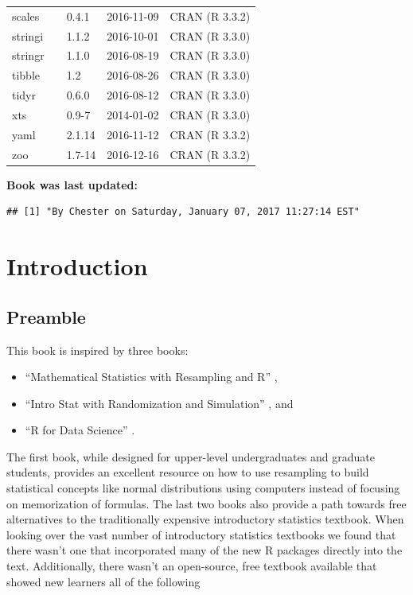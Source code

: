 \documentclass[]{tufte-book}
\providecommand{\tightlist}{%
  \setlength{\itemsep}{0pt}\setlength{\parskip}{0pt}}
\begin{document}
\begin{longtable}{lllll}
scales &  & 0.4.1 & 2016-11-09 & CRAN (R 3.3.2)\\
stringi &  & 1.1.2 & 2016-10-01 & CRAN (R 3.3.0)\\
stringr &  & 1.1.0 & 2016-08-19 & CRAN (R 3.3.0)\\
\addlinespace
tibble &  & 1.2 & 2016-08-26 & CRAN (R 3.3.0)\\
tidyr &  & 0.6.0 & 2016-08-12 & CRAN (R 3.3.0)\\
xts &  & 0.9-7 & 2014-01-02 & CRAN (R 3.3.0)\\
yaml &  & 2.1.14 & 2016-11-12 & CRAN (R 3.3.2)\\
zoo &  & 1.7-14 & 2016-12-16 & CRAN (R 3.3.2)\\
\bottomrule
\end{longtable}

\textbf{Book was last updated:}

\begin{verbatim}
## [1] "By Chester on Saturday, January 07, 2017 11:27:14 EST"
\end{verbatim}

\chapter{Introduction}\label{intro}

\section{Preamble}\label{preamble-1}

This book is inspired by three books:

\begin{itemize}
\tightlist
\item
  ``Mathematical Statistics with Resampling and R'' \citep{hester2011},
\item
  ``Intro Stat with Randomization and Simulation'' \citep{isrs2014}, and
\item
  ``R for Data Science'' \citep{rds2016}.
\end{itemize}

The first book, while designed for upper-level undergraduates and
graduate students, provides an excellent resource on how to use
resampling to build statistical concepts like normal distributions using
computers instead of focusing on memorization of formulas. The last two
books also provide a path towards free alternatives to the traditionally
expensive introductory statistics textbook. When looking over the vast
number of introductory statistics textbooks we found that there wasn't
one that incorporated many of the new R packages directly into the text.
Additionally, there wasn't an open-source, free textbook available that
showed new learners all of the following
\end{document}
